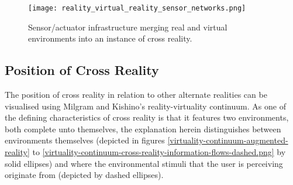 \begin{figure}[h]
	\centering
	\texttt{[image: reality\_virtual\_reality\_sensor\_networks.png]}
	\caption{Sensor/actuator infrastructure merging real and virtual environments into an instance of cross reality.}
	\label{reality_virtual_reality_sensor_networks.png}
\end{figure}



\subsection{Position of Cross Reality}

\label{positionofcrossreality}

\newcommand{\avxrfootnote}{\footnote{This discussion over the relationship between augmented reality and cross reality also stands for the relationship between augmented virtuality and cross reality, however as augmented virtuality has received less attention in the literature and in commercially available implementations, the discussion uses augmented reality as its example.}}

The position of cross reality in relation to other alternate realities can be visualised using Milgram and Kishino's reality-virtuality continuum. As one of the defining characteristics of cross reality is that it features two environments, both complete unto themselves, the explanation herein distinguishes between environments themselves (depicted in figures \ref{virtuality-continuum-augmented-reality} to \ref{virtuality-continuum-cross-reality-information-flows-dashed.png} by solid ellipses) and where the environmental stimuli that the user is perceiving originate from (depicted by dashed ellipses).


